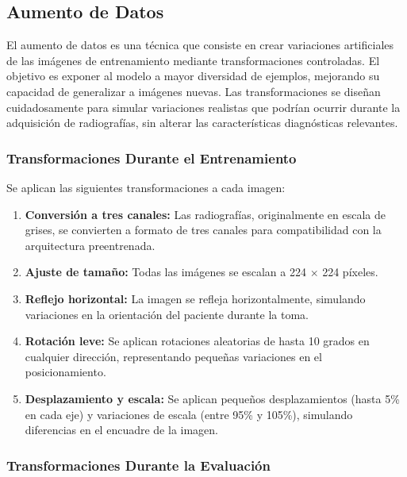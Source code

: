 \subsection{Aumento de Datos}
\label{subsec:augmentation_clasificador}

El aumento de datos es una técnica que consiste en crear variaciones artificiales de las imágenes de entrenamiento mediante transformaciones controladas. El objetivo es exponer al modelo a mayor diversidad de ejemplos, mejorando su capacidad de generalizar a imágenes nuevas. Las transformaciones se diseñan cuidadosamente para simular variaciones realistas que podrían ocurrir durante la adquisición de radiografías, sin alterar las características diagnósticas relevantes.

\subsubsection{Transformaciones Durante el Entrenamiento}

Se aplican las siguientes transformaciones a cada imagen:

\begin{enumerate}
    \item \textbf{Conversión a tres canales:} Las radiografías, originalmente en escala de grises, se convierten a formato de tres canales para compatibilidad con la arquitectura preentrenada.

    \item \textbf{Ajuste de tamaño:} Todas las imágenes se escalan a 224 $\times$ 224 píxeles.

    \item \textbf{Reflejo horizontal:} La imagen se refleja horizontalmente, simulando variaciones en la orientación del paciente durante la toma.

    \item \textbf{Rotación leve:} Se aplican rotaciones aleatorias de hasta 10 grados en cualquier dirección, representando pequeñas variaciones en el posicionamiento.

    \item \textbf{Desplazamiento y escala:} Se aplican pequeños desplazamientos (hasta 5\% en cada eje) y variaciones de escala (entre 95\% y 105\%), simulando diferencias en el encuadre de la imagen.
\end{enumerate}

\subsubsection{Transformaciones Durante la Evaluación}

